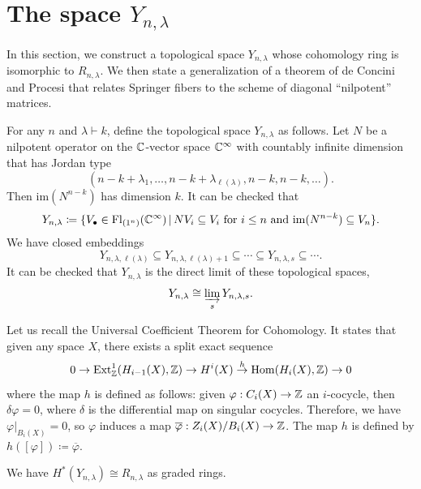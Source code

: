 \documentclass[12pt]{amsart}
\newcommand{\st}{\,|\,}
\newcommand{\Fl}{\mathrm{Fl}}
\newcommand{\la}{\lambda}
\newcommand{\im}{\mathrm{im}}
\newcommand{\Hom}{\mathrm{Hom}}
\begin{document}
\section{The space $Y_{n,\lambda}$}\label{sec:IndVariety}

In this section, we construct a topological space $Y_{n,\lambda}$ whose cohomology ring is isomorphic to $R_{n,\lambda}$. We then state a generalization of a theorem of de Concini and Procesi that relates Springer fibers to the scheme of diagonal ``nilpotent'' matrices.



For any $n$ and $\lambda\vdash k$, define the topological space $Y_{n,\la}$ as follows. Let $N$ be a nilpotent operator on the $\mathbb{C}$-vector space $\mathbb{C}^\infty$ with countably infinite dimension that has Jordan type \[(n-k+\la_1, \dots, n-k+\la_{\ell(\la)}, n-k,n-k,\dots).\] 
Then $\im(N^{n-k})$ has dimension $k$. It can be checked that 
\begin{align}
    Y_{n,\la}\coloneqq \{V_\bullet\in \Fl_{(1^n)}(\bC^\infty)\st NV_i\subseteq V_i \text{ for }i\leq n\text{ and }\im(N^{n-k})\subseteq V_n\}.
\end{align}
We have closed embeddings
\[
Y_{n,\la,\ell(\la)}\subseteq Y_{n,\la,\ell(\la)+1}\subseteq\cdots\subseteq Y_{n,\la,s}\subseteq\cdots.
\]
It can be checked that $Y_{n,\la}$ is the direct limit of these topological spaces,
\[Y_{n,\la} \cong \varinjlim_s Y_{n,\la,s}.\]

Let us recall the Universal Coefficient Theorem for Cohomology. It states that given any space $X$, there exists a split exact sequence
\[
0\to \mathrm{Ext}^1_\bZ(H_{i-1}(X),\bZ)\to H^i(X)\stackrel{h}{\to} \Hom(H_i(X),\bZ)\to 0
\]
where the map $h$ is defined as follows: given $\varphi: C_i(X)\to \mathbb{Z}$ an $i$-cocycle, then $\delta \varphi =0$, where $\delta$ is the differential map on singular cocycles. Therefore,  we have $\varphi|_{B_i(X)}=0$, so $\varphi$ induces a map $\overline \varphi :Z_i(X)/B_i(X)\to \mathbb{Z}$. The map $h$ is defined by $h([\varphi]) \coloneqq \overline\varphi$.


\begin{theorem}
We have $H^*(Y_{n,\la})\cong R_{n,\la}$ as graded rings.
\end{theorem}
\end{document}
